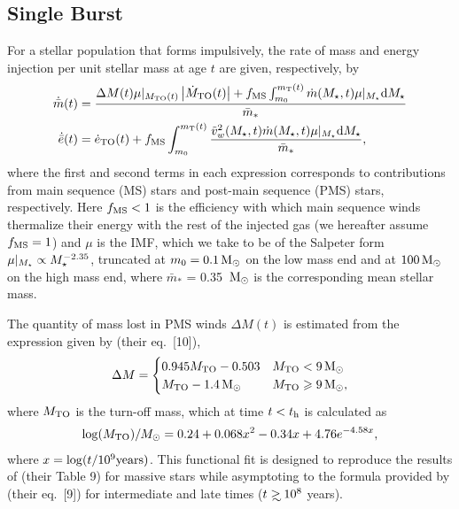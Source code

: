 \subsection{Single Burst}

For a stellar population that forms impulsively, the rate of mass and energy injection per unit stellar mass at age $t$ are given, respectively, by 
\begin{align} 
  \dot{\bar{m}}(t) &= \frac{\Delta M(t) \mu|_{M_{\rm TO}(t)}
    \left|\dot{M}_{\rm TO}(t)\right| + f_{\rm MS} \int_{m_0}^{m_{\rm
        T}(t)}
    \dot{m}(M_{\star}, t) \mu|_{M_{\star}} {\rm d}M_{\star} }{\bar{m}_*}\\
  \dot{\bar{e}}(t) &=\dot{e}_{\rm TO}(t)+ f_{\rm MS} \int_{m_0}^{m_{\rm T}(t)}
  \frac{\tilde{v}_{w}^2(M_{\star}, t) \dot{m}(M_{\star}, t) \mu|_{M_{\star}} {\rm d}M_{\star}}{\bar{m}_*},
  \label{eq:edotImp}
\end{align} 
where the first and second terms in each expression corresponds to
contributions from main sequence (MS) stars and post-main sequence
(PMS) stars, respectively.  Here $ f_{\rm MS} < 1$ is the efficiency
with which main sequence winds thermalize their energy with the rest
of the injected gas (we hereafter assume $f_{\rm MS} = 1$) and $\mu$
is the IMF, which we take to be of the Salpeter form $\mu|_{M_{\star}} \propto
M_{\star}^{-2.35}$, truncated at $m_0 = 0.1 \,{\rm M_\odot}$ on the low mass end and at
$100 \,{\rm M_\odot}$ on the high mass end, where $\bar{m}_*$ = 0.35 $\,{\rm M_\odot}$ is
the corresponding mean stellar mass.

The quantity of mass lost in PMS winds $\Delta M(t)$ is estimated from the expression given by \citet{CiottiOstriker:2007a} (their eq.~[10]),
\begin{align}
\Delta M=
\begin{cases}
0.945 M_{\rm TO}-0.503 & M_{\rm TO} < 9 \,{\rm M_\odot}\\
 M_{\rm TO}-1.4 \,{\rm M_\odot} &  M_{\rm TO} \geqslant 9 \,{\rm M_\odot},
\end{cases}
\end{align}
where $M_{\rm TO}$ is the turn-off mass, which at time $t < t_{\rm h}$ is calculated as
\begin{align}
\log(M_{\rm TO})/M_{\odot} =0.24 + 0.068 x^2-0.34 x+4.76 e^{-4.58 x},
\end{align}
where $x=\log(t/10^9 {\rm years})$.  This functional fit is designed
to reproduce the results of \citet{MaederMeynet:1987a} (their Table 9)
for massive stars while asymptoting to the formula provided by
\citet{CiottiOstriker:2007a} (their eq.~[9]) for intermediate and late
times ($t \gsim 10^8$ years).

